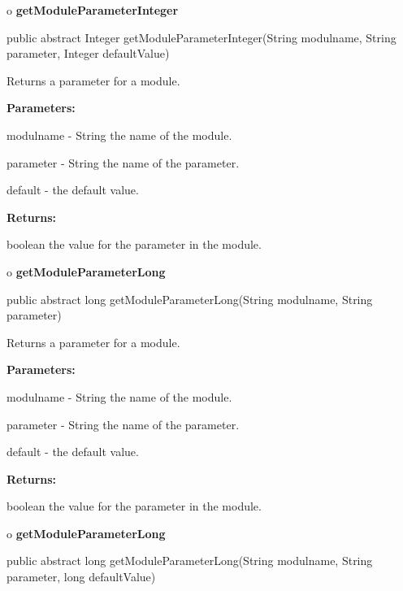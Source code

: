 o {\bf getModuleParameterInteger} 

\begin{PRE}
 public abstract Integer getModuleParameterInteger(String modulname,
                                                   String parameter,
                                                   Integer defaultValue)
\end{PRE}

\begin{description}
\htmlDD Returns a parameter for a module. 

\begin{description}
\item {\bf Parameters:}  

modulname - String the name of the module.  

parameter - String the name of the parameter.  

default - the default value.  
\item {\bf Returns:}  

boolean the value for the parameter in the module.  
\end{description}

\end{description}

o {\bf getModuleParameterLong} 

\begin{PRE}
 public abstract long getModuleParameterLong(String modulname,
                                             String parameter)
\end{PRE}

\begin{description}
\htmlDD Returns a parameter for a module. 

\begin{description}
\item {\bf Parameters:}  

modulname - String the name of the module.  

parameter - String the name of the parameter.  

default - the default value.  
\item {\bf Returns:}  

boolean the value for the parameter in the module.  
\end{description}

\end{description}

o {\bf getModuleParameterLong} 

\begin{PRE}
 public abstract long getModuleParameterLong(String modulname,
                                             String parameter,
                                             long defaultValue)
\end{PRE}

